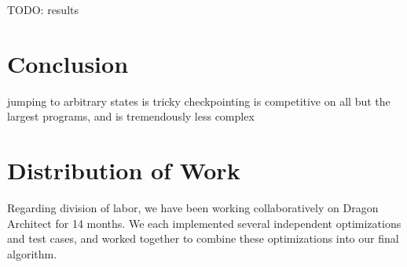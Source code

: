 \documentclass{sig-alternate}
\newcommand{\todo}[1]{{\color{red} TODO: #1}}
\begin{document}
\todo{results}

\section{Conclusion}
jumping to arbitrary states is tricky
checkpointing is competitive on all but the largest programs, and is tremendously less complex

\section{Distribution of Work}
Regarding division of labor, we have been working collaboratively on Dragon Architect for 14 months. We each implemented several independent optimizations and test cases, and worked together to combine these optimizations into our final algorithm.




\appendix
\end{document}

